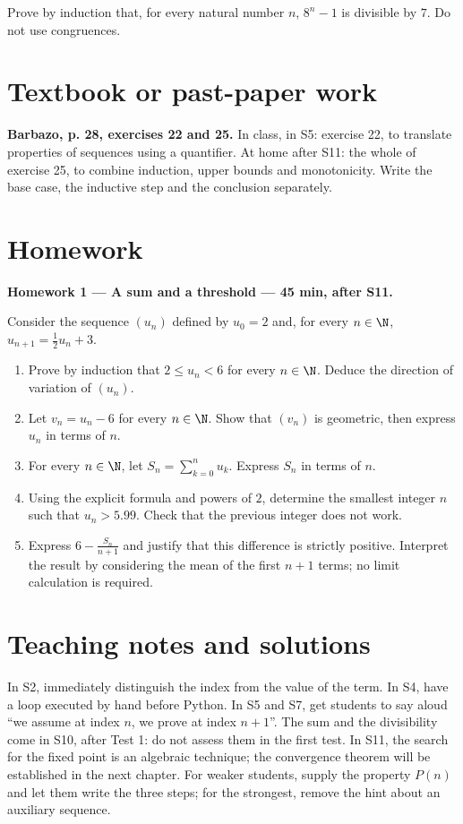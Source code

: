 Prove by induction that, for every natural number $n$, $8^n-1$ is divisible by $7$. Do not use congruences.

\section{Textbook or past-paper work}\textbf{Barbazo, p. 28, exercises 22 and 25.} In class, in S5: exercise 22, to translate properties of sequences using a quantifier. At home after S11: the whole of exercise 25, to combine induction, upper bounds and monotonicity. Write the base case, the inductive step and the conclusion separately.

\mxnewpage
\section{Homework}\textbf{Homework 1 --- A sum and a threshold --- 45 min, after S11.}\par Consider the sequence $(u_n)$ defined by $u_0=2$ and, for every $n\in\N$, $u_{n+1}=\frac12u_n+3$.
\begin{enumerate}\item Prove by induction that $2\le u_n<6$ for every $n\in\N$. Deduce the direction of variation of $(u_n)$.
\item Let $v_n=u_n-6$ for every $n\in\N$. Show that $(v_n)$ is geometric, then express $u_n$ in terms of $n$.
\item For every $n\in\N$, let $S_n=\displaystyle\sum_{k=0}^n u_k$. Express $S_n$ in terms of $n$.
\item Using the explicit formula and powers of $2$, determine the smallest integer $n$ such that $u_n>\num{5,99}$. Check that the previous integer does not work.
\item Express $6-\frac{S_n}{n+1}$ and justify that this difference is strictly positive. Interpret the result by considering the mean of the first $n+1$ terms; no limit calculation is required.\end{enumerate}

\ifmxteacher\mxnewpage\section{Teaching notes and solutions}\begin{teachernote}In S2, immediately distinguish the index from the value of the term. In S4, have a loop executed by hand before Python. In S5 and S7, get students to say aloud ``we assume at index $n$, we prove at index $n+1$''. The sum and the divisibility come in S10, after Test 1: do not assess them in the first test. In S11, the search for the fixed point is an algebraic technique; the convergence theorem will be established in the next chapter. For weaker students, supply the property $P(n)$ and let them write the three steps; for the strongest, remove the hint about an auxiliary sequence.\end{teachernote}

